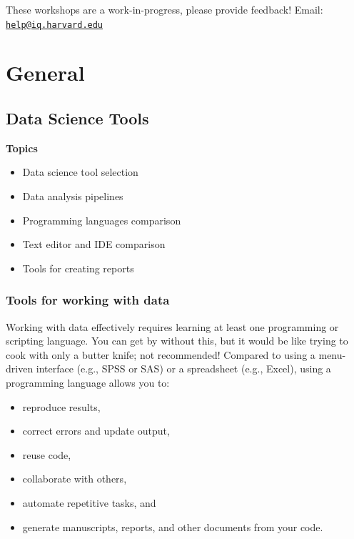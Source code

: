 \documentclass[
]{book}
\providecommand{\tightlist}{%
  \setlength{\itemsep}{0pt}\setlength{\parskip}{0pt}}
\begin{document}
These workshops are a work-in-progress, please provide feedback! Email: \href{mailto:help@iq.harvard.edu}{\nolinkurl{help@iq.harvard.edu}}

\hypertarget{part-general}{%
\part{General}\label{part-general}}

\hypertarget{data-science-tools}{%
\chapter{Data Science Tools}\label{data-science-tools}}

\textbf{Topics}

\begin{itemize}
\tightlist
\item
  Data science tool selection
\item
  Data analysis pipelines
\item
  Programming languages comparison
\item
  Text editor and IDE comparison
\item
  Tools for creating reports
\end{itemize}

\hypertarget{tools-for-working-with-data}{%
\section{Tools for working with data}\label{tools-for-working-with-data}}

Working with data effectively requires learning at least one programming or scripting language. You can get by without this, but it would be like trying to cook with only a butter knife; not recommended! Compared to using a menu-driven interface (e.g., SPSS or SAS) or a spreadsheet (e.g., Excel), using a programming language allows you to:

\begin{itemize}
\tightlist
\item
  reproduce results,
\item
  correct errors and update output,
\item
  reuse code,
\item
  collaborate with others,
\item
  automate repetitive tasks, and
\item
  generate manuscripts, reports, and other documents from your code.
\end{itemize}
\end{document}
